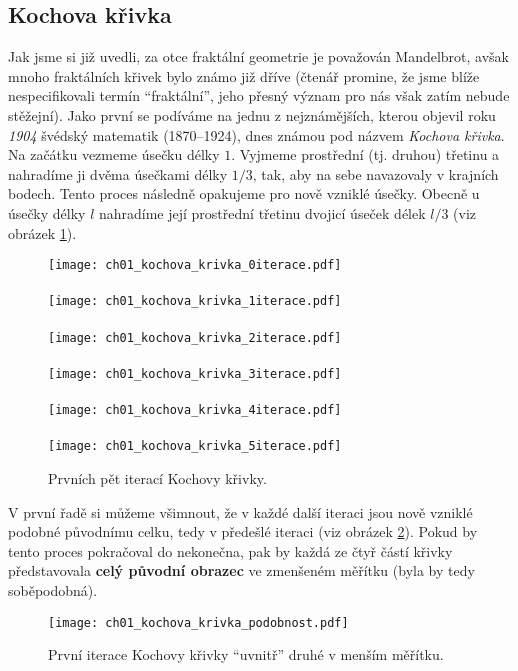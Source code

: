 \subsection{Kochova křivka}\label{subsec:kochova_krivka}
Jak jsme si již uvedli, za otce fraktální geometrie je považován Mandelbrot, avšak mnoho fraktálních křivek bylo známo již dříve (čtenář promine, že jsme blíže nespecifikovali termín ``fraktální'', jeho přesný význam pro nás však zatím nebude stěžejní). Jako první se podíváme na jednu z nejznámějších, kterou objevil roku \emph{1904} švédský matematik  \mbox{(1870--1924)}, dnes známou pod názvem \emph{Kochova křivka}. \citep[str. 61]{Peitgen2004} Na začátku vezmeme úsečku délky $1$. Vyjmeme prostřední (tj. druhou) třetinu a nahradíme ji dvěma úsečkami délky $1/3$, tak, aby na sebe navazovaly v krajních bodech. Tento proces následně opakujeme pro nově vzniklé úsečky. Obecně u úsečky délky $l$ nahradíme její prostřední třetinu dvojicí úseček délek $l/3$ (viz obrázek \ref{fig:kochova_vlocka_5iteraci}).
\begin{figure}[h]
    \centering
    \texttt{[image: ch01\_kochova\_krivka\_0iterace.pdf]}\\\qquad\\
    \texttt{[image: ch01\_kochova\_krivka\_1iterace.pdf]}\\\qquad\\
    \texttt{[image: ch01\_kochova\_krivka\_2iterace.pdf]}\\\qquad\\
    \texttt{[image: ch01\_kochova\_krivka\_3iterace.pdf]}\\\qquad\\
    \texttt{[image: ch01\_kochova\_krivka\_4iterace.pdf]}\\\qquad\\
    \texttt{[image: ch01\_kochova\_krivka\_5iterace.pdf]}
    \caption{Prvních pět iterací Kochovy křivky.}
    \label{fig:kochova_vlocka_5iteraci}
\end{figure}
V první řadě si můžeme všimnout, že v každé další iteraci jsou nově vzniklé podobné původnímu celku, tedy v předešlé iteraci (viz obrázek \ref{fig:kochova_krivka_podobnost}). Pokud by tento proces pokračoval do nekonečna, pak by každá ze čtyř částí křivky představovala \textbf{celý původní obrazec} ve zmenšeném měřítku (byla by tedy soběpodobná).
\begin{figure}[h]
    \centering
    \texttt{[image: ch01\_kochova\_krivka\_podobnost.pdf]}
    \caption{První iterace Kochovy křivky ``uvnitř'' druhé v menším měřítku.}
    \label{fig:kochova_krivka_podobnost}
\end{figure}
